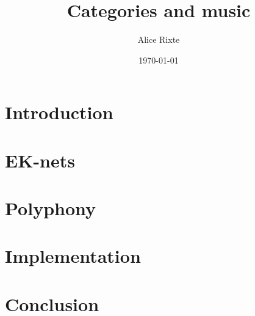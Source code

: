 \documentclass{report}
\begin{document}

\title{Categories and music}
\author{Alice Rixte}
\date{\today}
\maketitle %


\tableofcontents




\chapter{Introduction}



\chapter{EK-nets}


\chapter{Polyphony}


\chapter{Implementation}


\chapter{Conclusion}


\printnomenclature[2cm]

\newpage


\end{document}
